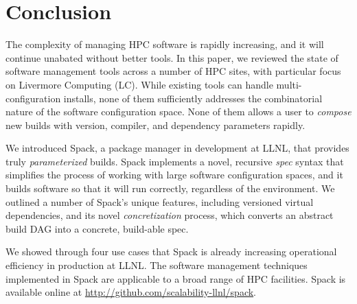 
\section{Conclusion}
\label{sec:conclusion}


The complexity of managing HPC software is rapidly increasing, and it
will continue unabated without better tools.
In this paper, we reviewed the state of software management tools
across a number of HPC sites, with particular focus on Livermore
Computing (LC). While existing tools can handle multi-configuration
installs, none of them sufficiently addresses the combinatorial nature
of the software configuration space. None of them allows
a user to {\it compose} new builds with version, compiler,
and dependency parameters rapidly.

We introduced Spack, a package manager in development at LLNL, that
provides truly {\it parameterized} builds.  Spack implements
a novel, recursive {\it spec} syntax that simplifies the process of working
with large software configuration spaces, and it builds software
so that it will run correctly, regardless of the environment.
We outlined a number of Spack's unique features, including
versioned virtual dependencies, and its novel {\it concretization}
process, which converts an abstract build DAG into a concrete,
build-able spec.

We showed through four use cases that Spack is already increasing
operational efficiency in production at LLNL. The
software management techniques implemented in Spack are applicable
to a broad range of HPC facilities.
Spack is available online at \url{http://github.com/scalability-llnl/spack}.
